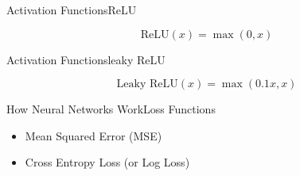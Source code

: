 \documentclass{beamer}
\begin{document}
\begin{frame}{Activation Functions}{ReLU}
    \begin{multicols}{2}
        \begin{equation}
            \text{ReLU}(x)=\max(0,x)
        \end{equation}
        \begin{center}
        \end{center}
    \end{multicols}
\end{frame}

\begin{frame}{Activation Functions}{leaky ReLU}
    \begin{multicols}{2}
        \begin{equation}
            \text{Leaky ReLU}(x) = \max(0.1x,x)
        \end{equation}
        \begin{center}
        \end{center}
    \end{multicols}
\end{frame}

\begin{frame}{How Neural Networks Work}{Loss Functions}
    \begin{itemize}
        \item Mean Squared Error (MSE)
        \item Cross Entropy Loss (or Log Loss)
    \end{itemize}
\end{frame}
\end{document}
